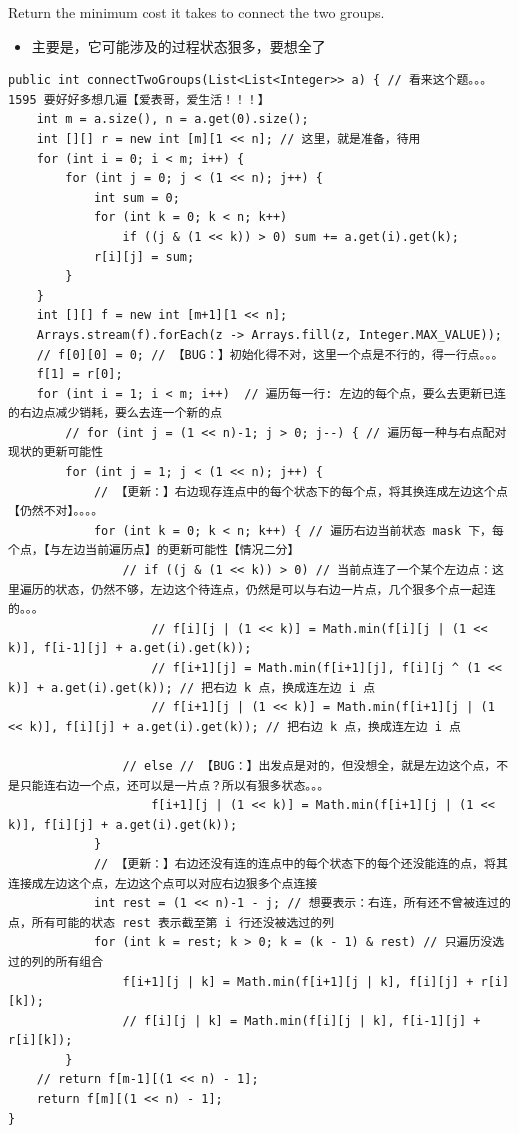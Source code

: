 \documentclass[9pt, b5paaper]{book}
\begin{document}
Return the minimum cost it takes to connect the two groups.

\begin{itemize}
\item 主要是，它可能涉及的过程状态狠多，要想全了
\end{itemize}

\begin{verbatim}
public int connectTwoGroups(List<List<Integer>> a) { // 看来这个题。。。1595 要好好多想几遍【爱表哥，爱生活！！！】
    int m = a.size(), n = a.get(0).size();
    int [][] r = new int [m][1 << n]; // 这里，就是准备，待用
    for (int i = 0; i < m; i++) {
        for (int j = 0; j < (1 << n); j++) {
            int sum = 0;
            for (int k = 0; k < n; k++)
                if ((j & (1 << k)) > 0) sum += a.get(i).get(k);
            r[i][j] = sum;
        }
    }
    int [][] f = new int [m+1][1 << n];
    Arrays.stream(f).forEach(z -> Arrays.fill(z, Integer.MAX_VALUE));
    // f[0][0] = 0; // 【BUG：】初始化得不对，这里一个点是不行的，得一行点。。。
    f[1] = r[0];
    for (int i = 1; i < m; i++)  // 遍历每一行: 左边的每个点，要么去更新已连的右边点减少销耗，要么去连一个新的点
        // for (int j = (1 << n)-1; j > 0; j--) { // 遍历每一种与右点配对现状的更新可能性
        for (int j = 1; j < (1 << n); j++) {
            // 【更新：】右边现存连点中的每个状态下的每个点，将其换连成左边这个点【仍然不对】。。。。
            for (int k = 0; k < n; k++) { // 遍历右边当前状态 mask 下，每个点，【与左边当前遍历点】的更新可能性【情况二分】
                // if ((j & (1 << k)) > 0) // 当前点连了一个某个左边点：这里遍历的状态，仍然不够，左边这个待连点，仍然是可以与右边一片点，几个狠多个点一起连的。。。
                    // f[i][j | (1 << k)] = Math.min(f[i][j | (1 << k)], f[i-1][j] + a.get(i).get(k));
                    // f[i+1][j] = Math.min(f[i+1][j], f[i][j ^ (1 << k)] + a.get(i).get(k)); // 把右边 k 点，换成连左边 i 点
                    // f[i+1][j | (1 << k)] = Math.min(f[i+1][j | (1 << k)], f[i][j] + a.get(i).get(k)); // 把右边 k 点，换成连左边 i 点

                // else // 【BUG：】出发点是对的，但没想全，就是左边这个点，不是只能连右边一个点，还可以是一片点？所以有狠多状态。。。
                    f[i+1][j | (1 << k)] = Math.min(f[i+1][j | (1 << k)], f[i][j] + a.get(i).get(k));
            }
            // 【更新：】右边还没有连的连点中的每个状态下的每个还没能连的点，将其连接成左边这个点，左边这个点可以对应右边狠多个点连接
            int rest = (1 << n)-1 - j; // 想要表示：右连，所有还不曾被连过的点，所有可能的状态 rest 表示截至第 i 行还没被选过的列
            for (int k = rest; k > 0; k = (k - 1) & rest) // 只遍历没选过的列的所有组合 
                f[i+1][j | k] = Math.min(f[i+1][j | k], f[i][j] + r[i][k]);
                // f[i][j | k] = Math.min(f[i][j | k], f[i-1][j] + r[i][k]);
        }
    // return f[m-1][(1 << n) - 1];
    return f[m][(1 << n) - 1];
}
\end{verbatim}
\end{document}
